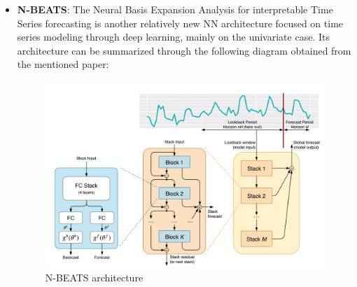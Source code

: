 \begin{itemize}

    
    \item \textbf{N-BEATS}: The Neural Basis Expansion Analysis for interpretable Time Series forecasting is another relatively new NN architecture focused on time series modeling through deep learning, mainly on the univariate case. Its architecture can be summarized through the following diagram obtained from the mentioned paper:
    \begin{figure}[ht]
        \centering
        \captionsetup{justification=centering}
        \includegraphics[width=\linewidth]{assets/nbeats-architecture.png}
        \caption{N-BEATS architecture}
        \label{fig:nbeats-architecture}
    \end{figure}

\end{itemize}
